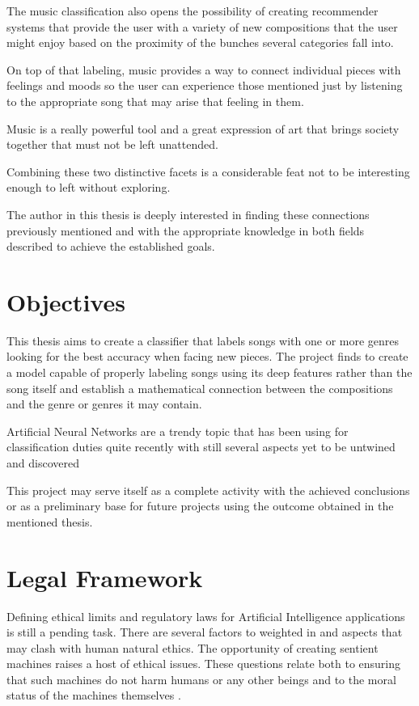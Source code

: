 The music classification also opens the possibility of creating recommender systems that provide the user with a variety of new compositions that the user might enjoy based on the proximity of the bunches several categories fall into. 

On top of that labeling, music provides a way to connect individual pieces with feelings and moods so the user can experience those mentioned just by listening to the appropriate song that may arise that feeling in them.

Music is a really powerful tool and a great expression of art that brings society together that must not be left unattended.

Combining these two distinctive facets is a considerable feat not to be interesting enough to left without exploring.

The author in this thesis is deeply interested in finding these connections previously mentioned and with the appropriate knowledge in both fields described to achieve the established goals.
\newpage

\section{Objectives}
This thesis aims to create a classifier that labels songs with one or more genres looking for the best accuracy when facing new pieces. The project finds to create a model capable of properly labeling songs using its deep features rather than the song itself and establish a mathematical connection between the compositions and the genre or genres it may contain.

Artificial Neural Networks are a trendy topic that has been using for classification duties quite recently with still several aspects yet to be untwined and discovered

This project may serve itself as a complete activity with the achieved conclusions or as a preliminary base for future projects using the outcome obtained in the mentioned thesis.

\newpage
\section{Legal Framework}
Defining ethical limits and regulatory laws for Artificial Intelligence applications is still a pending task.
There are several factors to weighted in and aspects that may clash with human natural ethics.
The opportunity of creating sentient machines raises a host of ethical issues. 
These questions relate both to ensuring that such machines do not harm humans or any other beings and to the moral status of the machines themselves \cite{Bostrom2011}. 


